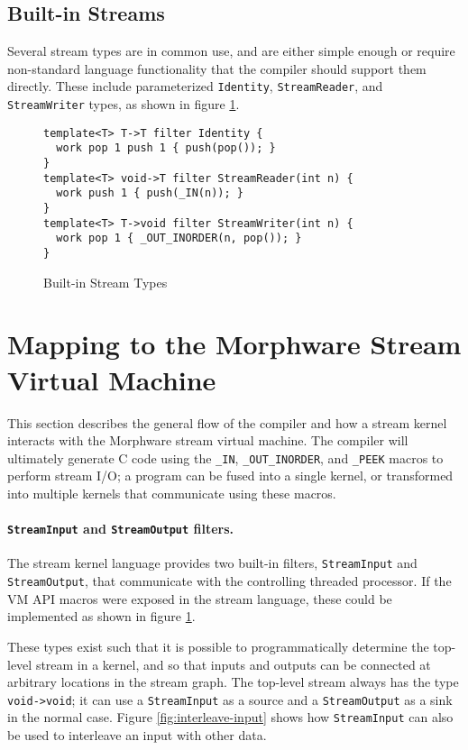 \documentclass[11pt]{article}
\begin{document}
\subsection{Built-in Streams}
\label{sec:built-in-streams}

Several stream types are in common use, and are either simple enough
or require non-standard language functionality that the compiler
should support them directly.  These include parameterized
\texttt{Identity}, \texttt{StreamReader}, and \texttt{StreamWriter}
types, as shown in figure \ref{fig:built-in-streams}.

\begin{figure}[htbp]
    \begin{verbatim}
template<T> T->T filter Identity {
  work pop 1 push 1 { push(pop()); }
}
template<T> void->T filter StreamReader(int n) {
  work push 1 { push(_IN(n)); }
}
template<T> T->void filter StreamWriter(int n) {
  work pop 1 { _OUT_INORDER(n, pop()); }
}
\end{verbatim}
    \caption{Built-in Stream Types}
    \label{fig:built-in-streams}
\end{figure}

\section{Mapping to the Morphware Stream Virtual Machine}

This section describes the general flow of the compiler and how a
stream kernel interacts with the Morphware stream virtual machine.
The compiler will ultimately generate C code using the \texttt{\_IN},
\texttt{\_OUT\_INORDER}, and \texttt{\_PEEK} macros to perform stream
I/O; a program can be fused into a single kernel, or transformed into
multiple kernels that communicate using these macros.

\paragraph{\texttt{StreamInput} and \texttt{StreamOutput} filters.}
The stream kernel language provides two built-in filters,
\texttt{StreamInput} and \texttt{StreamOutput}, that communicate with
the controlling threaded processor.  If the VM API macros were exposed
in the stream language, these could be implemented as shown in figure
\ref{fig:built-in-streams}.

These types exist such that it is possible to programmatically
determine the top-level stream in a kernel, and so that inputs and
outputs can be connected at arbitrary locations in the stream graph.
The top-level stream always has the type \texttt{void->void}; it can
use a \texttt{StreamInput} as a source and a \texttt{StreamOutput} as
a sink in the normal case.  Figure \ref{fig:interleave-input} shows
how \texttt{StreamInput} can also be used to interleave an input with
other data.
\end{document}
